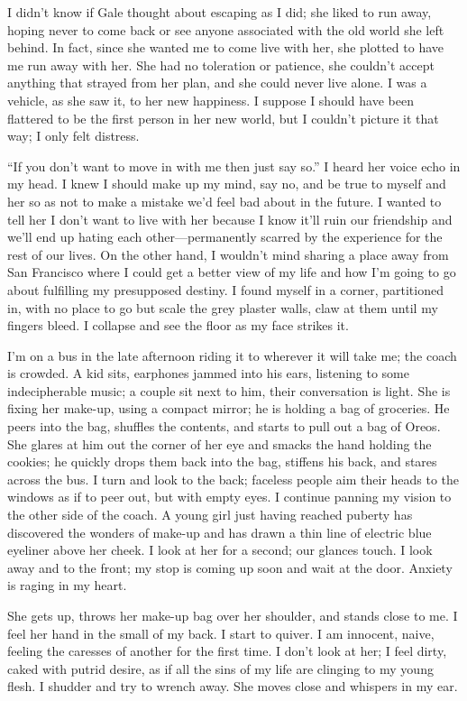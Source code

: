 I didn't know if Gale thought about escaping as I did; she liked to run
away, hoping never to come back or see anyone associated with the old
world she left behind. In fact, since she wanted me to come live with
her, she plotted to have me run away with her. She had no toleration or
patience, she couldn't accept anything that strayed from her plan, and
she could never live alone. I was a vehicle, as she saw it, to her new
happiness. I suppose I should have been flattered to be the first person
in her new world, but I couldn't picture it that way; I only felt
distress.

``If you don't want to move in with me then just say so.'' I heard her
voice echo in my head. I knew I should make up my mind, say no, and be
true to myself and her so as not to make a mistake we'd feel bad about
in the future. I wanted to tell her I don't want to live with her
because I know it'll ruin our friendship and we'll end up hating each
other---permanently scarred by the experience for the rest of our lives.
On the other hand, I wouldn't mind sharing a place away from San
Francisco where I could get a better view of my life and how I'm going
to go about fulfilling my presupposed destiny. I found myself in a
corner, partitioned in, with no place to go but scale the grey plaster
walls, claw at them until my fingers bleed. I collapse and see the floor
as my face strikes it.

I'm on a bus in the late afternoon riding it to wherever it will take
me; the coach is crowded. A kid sits, earphones jammed into his ears,
listening to some indecipherable music; a couple sit next to him, their
conversation is light. She is fixing her make-up, using a compact
mirror; he is holding a bag of groceries. He peers into the bag,
shuffles the contents, and starts to pull out a bag of Oreos. She glares
at him out the corner of her eye and smacks the hand holding the
cookies; he quickly drops them back into the bag, stiffens his back, and
stares across the bus. I turn and look to the back; faceless people aim
their heads to the windows as if to peer out, but with empty eyes. I
continue panning my vision to the other side of the coach. A young girl
just having reached puberty has discovered the wonders of make-up and
has drawn a thin line of electric blue eyeliner above her cheek. I look
at her for a second; our glances touch. I look away and to the front; my
stop is coming up soon and wait at the door. Anxiety is raging in my
heart.

She gets up, throws her make-up bag over her shoulder, and stands close
to me. I feel her hand in the small of my back. I start to quiver. I am
innocent, naive, feeling the caresses of another for the first time. I
don't look at her; I feel dirty, caked with putrid desire, as if all the
sins of my life are clinging to my young flesh. I shudder and try to
wrench away. She moves close and whispers in my ear.

